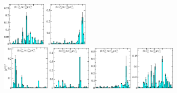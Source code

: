\begin{figure}[H]
    \includegraphics[width=0.185\textwidth]{figures/sigmas/hg/zfactors/zfactor_isotriplet_kbar_nucleon-Hg_1-P010-A1-SS_2-P0-10-G1-SS_0.pdf}
    \includegraphics[width=0.18\textwidth]{figures/sigmas/hg/zfactors/zfactor_isotriplet_kbar_nucleon-Hg_1-P010-A2-SS_0-P0-10-G1-SS_0.pdf}\\
    \includegraphics[width=0.20\textwidth]{figures/sigmas/hg/zfactors/zfactor_isotriplet_kbar_nucleon-Hg_1-P010-A2-SS_1-P0-10-G1-SS_0.pdf}
    \includegraphics[width=0.18\textwidth]{figures/sigmas/hg/zfactors/zfactor_isotriplet_kbar_nucleon-Hg_1-P011-A2-SS_0-P0-1-1-G-SS_0.pdf}
    \hspace*{0.1cm}\includegraphics[width=0.18\textwidth]{figures/sigmas/hg/zfactors/zfactor_isotriplet_kbar_nucleon-Hg_1-P011-A2-SS_1-P0-1-1-G-SS_0.pdf}
    \hspace*{-0.05cm}\includegraphics[width=0.185\textwidth]{figures/sigmas/hg/zfactors/zfactor_isotriplet_kbar_nucleon-Hg_1-P020-A2-SS_1-P0-20-G1-SS_0.pdf}

\end{figure}
